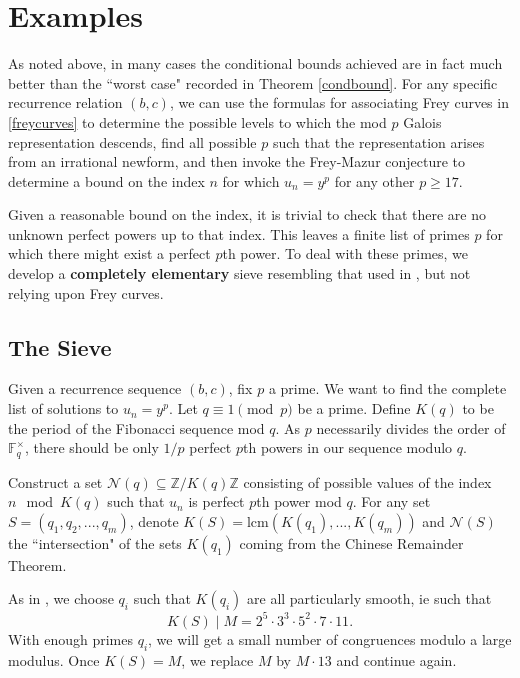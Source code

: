 \documentclass[12pt]{amsart}
\theoremstyle{definition}
\def\F{{\mathbb F}}
\def\N{{\mathcal N}}
\def\Z{{\mathbb Z}}
\newcommand{\lcm}{\text{lcm}}
\begin{document}
\section{Examples}\label{examples}

As noted above, in many cases the conditional bounds achieved are in fact much better than the ``worst case" recorded in Theorem \ref{condbound}.  For any specific recurrence relation $(b,c)$, we can use the formulas for associating Frey curves in \ref{freycurves} to determine the possible levels to which the mod $p$ Galois representation descends, find all possible $p$ such that the representation arises from an irrational newform, and then invoke the Frey-Mazur conjecture to determine a bound on the index $n$ for which $u_n=y^p$ for any other $p \geq 17$.  

Given a reasonable bound on the index, it is trivial to check that there are no unknown perfect powers up to that index.  This leaves a finite list of primes $p$ for which there might exist a perfect $p$th power.  To deal with these primes, we develop a \textbf{completely elementary} sieve resembling that used in \cite{siksek06}, but not relying upon Frey curves.

\subsection{The Sieve}

Given a recurrence sequence $(b,c)$, fix $p$ a prime.  We want to find the complete list of solutions to $u_n = y^p$.  Let $q \equiv 1 \pmod{p}$ be a prime.  Define $K(q)$ to be the period of the Fibonacci sequence mod $q$.  As $p$ necessarily divides the order of $\F_q^\times$, there should be only $1/p$ perfect $p$th powers in our sequence modulo $q$.  

Construct a set $\N(q) \subseteq \Z/K(q)\Z $ consisting of possible values of the index $n \mod{K(q)}$ such that $u_n$ is perfect $p$th power mod $q$.  For any set $S = (q_1,q_2,...,q_m)$, denote $K(S) = \lcm(K(q_1),...,K(q_m))$ and $\N(S)$ the ``intersection" of the sets $K(q_1)$ coming from the Chinese Remainder Theorem.


As in \cite{siksek06}, we choose $q_i$ such that $K(q_i)$ are all particularly smooth, ie such that 
\[K(S) \mid M = 2^5 \cdot 3^3 \cdot 5^2 \cdot 7 \cdot 11.\]
With enough primes $q_i$, we will get a small number of congruences modulo a large modulus.  Once $K(S) = M$, we replace $M$ by $M  \cdot 13$ and continue again. 
\end{document}
